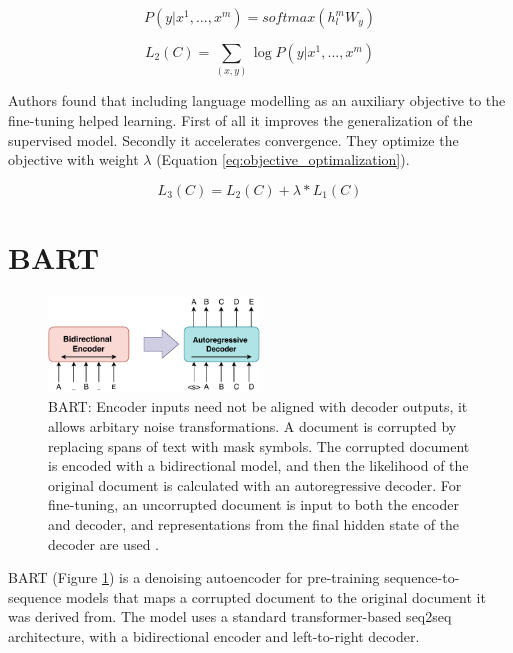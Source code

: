 \begin{equation} \label{eq:supervised_fine_tune}
P(y|x^1, ... , x^m) = softmax(h_l^m W_y)
\end{equation}

\begin{equation} \label{eq:supervised_maximize}
L_2(C) = \sum_{(x,y)} \log P(y|x^1, ... , x^m)
\end{equation}

Authors found that including language modelling as an auxiliary objective to the fine-tuning helped learning. First of all it improves the generalization of the supervised model. Secondly it accelerates convergence. They optimize the objective with weight $\lambda$ (Equation \ref{eq:objective_optimalization}).

\begin{equation} \label{eq:objective_optimalization}
L_3(C) = L_2(C) + \lambda * L_1(C)
\end{equation}

\section{BART} \label{bart_section}

\begin{figure}[hbt]
  \centering
  \includegraphics[width=0.5\textwidth]{figures/BART.pdf}
  \caption{BART: Encoder inputs need not be aligned with decoder outputs, it allows arbitary noise transformations. A document is corrupted by replacing spans of text with mask symbols. The corrupted document is encoded with a bidirectional model, and then the likelihood of the original document is calculated with an autoregressive decoder. For fine-tuning, an uncorrupted document is input to both the encoder and decoder, and representations from the final hidden state of the decoder are used \cite{lewis2019bart}.}
  \label{fig:bart}
\end{figure}

BART (Figure \ref{fig:bart}) is a denoising autoencoder for pre-training sequence-to-sequence models that maps a corrupted document to the original document it was derived from. The model uses a standard transformer-based seq2seq architecture, with a bidirectional encoder and left-to-right decoder.

